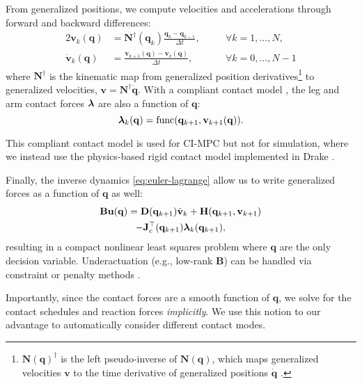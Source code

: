 From generalized positions, we compute velocities and accelerations through forward and backward differences:
\begin{alignat}{2} 
    {\bm v}_k (\bm q) &= \bm N^\dagger(\bm q_k)
    \frac{\bm q_k - \bm q_{k-1}}{\Delta t}, &&\quad\forall k = 1,\dots, N, \label{eq:velocity_q}\\
    \dot {\bm v}_k (\bm q) &= 
    \frac{{\bm v}_{k+1}(\bm q) - {\bm v}_{k}(\bm q)}{\Delta t}, \; \;&&\quad\forall k = 0, \dots, N-1 \label{eq:acceleration_q}
\end{alignat}
where $\bm N^\dagger$ is the kinematic map from generalized position derivatives\footnote{$\bm N(\bm q)^\dagger$ is the left pseudo-inverse of $\bm N(\bm q)$, which maps generalized velocities $\bm v$ to the time derivative of generalized positions $\dot{\bm q}$ \cite{underactuated}.} to generalized velocities, $\bm v = \bm N^\dagger \dot{\bm q}$.
%
With a compliant contact model \cite{kurtz2023inverse}, the leg and arm contact forces $\boldsymbol{\lambda}$ are also a function of $\bm q$:
%
\begin{equation} \label{eq:GRF_q}
    \boldsymbol{\lambda}_k (\mathbf{q}) = \mathrm{func} (\mathbf{q}_{k+1}, {\mathbf{v}}_{k+1}(\mathbf{q})).
\end{equation}
\begin{remark}
    This compliant contact model is used for CI-MPC but not for simulation, where we instead use the physics-based rigid contact model implemented in Drake \cite{drake}.
\end{remark}

Finally, the inverse dynamics \eqref{eq:euler-lagrange} allow us to write generalized forces as a function of $\bm q$ as well:
\begin{multline} \label{eq:inverse_dynamics}
    \mathbf{B} \mathbf{u}(\mathbf{q}) = \mathbf{D}(\mathbf{q}_{k+1}) \dot {\mathbf{v}}_k + 
    \mathbf{H}(\mathbf{q}_{k+1}, \mathbf{v}_{k+1}) \\
    - \mathbf{J}_c^\top(\mathbf{q}_{k+1}) \boldsymbol{\lambda}_k(\mathbf{q}_{k+1}),
\end{multline}
resulting in a compact nonlinear least squares problem where $\bm q$ are the only decision variable. Underactuation (e.g., low-rank $\bm B$) can be handled via constraint or penalty methods \cite{kurtz2023inverse}. 

Importantly, since the contact forces are a smooth function of $\bm q$, we solve for the contact schedules and reaction forces \textit{implicitly}. We use this notion to our advantage to automatically consider different contact modes.

